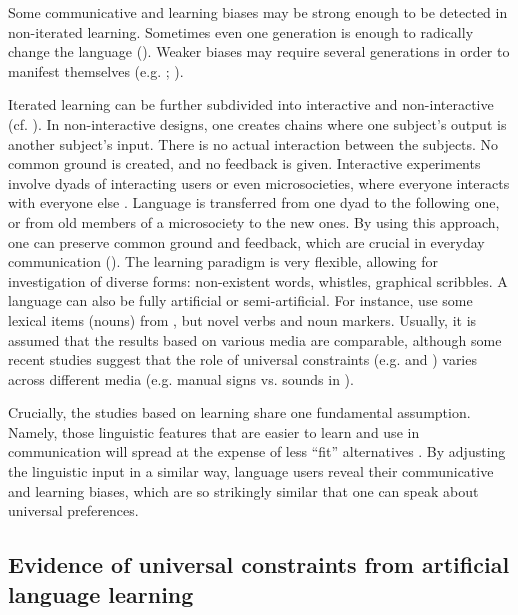 \documentclass[output=paper]{langsci/langscibook}
\begin{document}
Some communicative and learning biases may be strong enough to be detected in non-iterated learning. Sometimes even one generation is enough to radically change the language (\citealt{Hudson2009_ChangeLearn}). Weaker biases may require several generations in order to manifest themselves (e.g. \citealt{RealiGriffiths2009}; \citealt{SmithWonnacott2010}). 

Iterated learning can be further subdivided into interactive and non-interactive (cf. \citealt{Tamariz2017}). In non-interactive designs, one creates  chains where one subject’s output is another subject’s input. There is no actual interaction between the subjects. No common ground is created, and no feedback is given. Interactive experiments involve dyads of interacting users or even microsocieties, where everyone interacts with everyone else \citep{Tamariz2017}. Language is transferred from one dyad to the following one, or from old members of a microsociety to the new ones. By using this approach, one can preserve common ground and feedback, which are crucial in everyday communication (\citealt{CaldwellSmith2012}). 
\newpage
The  learning paradigm is very flexible, allowing for investigation of diverse forms: non-existent words, whistles, graphical scribbles. A language can also be fully artificial or semi-artificial. For instance, \citet{SmithWonnacott2010} use some lexical items (nouns) from , but novel verbs and  noun markers. Usually, it is assumed that the results based on various media are comparable, although some recent studies suggest that the role of universal constraints (e.g.  and ) varies across different media (e.g. manual signs vs. sounds in \citealt{LittleEtAl2017}).

Crucially, the studies based on  learning share one fundamental assumption. Namely, those linguistic features that are easier to learn and use in communication will spread at the expense of less “fit” alternatives \citep{SmithEtAl2017}. By adjusting the linguistic input in a similar way, language users reveal their communicative and learning biases, which are so strikingly similar that one can speak about universal preferences. 

\subsection{Evidence of universal constraints from artificial language learning}
\end{document}
